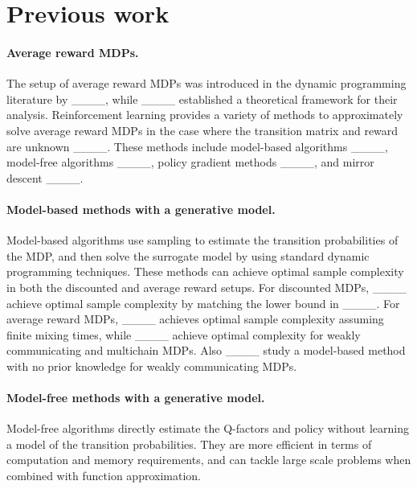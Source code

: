 \section{Previous work}
\label{sec:prev_work}
\paragraph{Average reward MDPs.}
The setup of average reward MDPs was introduced  in the dynamic programming literature by ____, while ____ established a theoretical framework for their analysis. Reinforcement learning provides a variety of methods to approximately solve average reward MDPs in the case where the transition matrix and reward are unknown ____. These methods include model-based algorithms ____, model-free algorithms ____, policy gradient methods ____, and mirror descent  ____. 


\paragraph{Model-based methods with a generative model.}
Model-based algorithms use sampling to estimate the transition probabilities of the MDP, and then solve the surrogate model by using standard dynamic programming techniques. These methods can achieve optimal sample complexity in both the discounted and average reward setups. For discounted MDPs, ____ achieve optimal sample complexity by matching the lower bound in ____. For average reward MDPs,  ____ achieves optimal sample complexity assuming finite mixing times, while  ____ achieve optimal complexity for weakly communicating and multichain MDPs. Also ____ study a model-based method with no prior knowledge  for weakly communicating MDPs. 

\paragraph{Model-free methods with a generative model.}
Model-free algorithms directly estimate the Q-factors and policy without learning a model of the transition probabilities. They are more efficient in terms of  computation and memory requirements, and can tackle large scale problems when combined with function approximation. 

